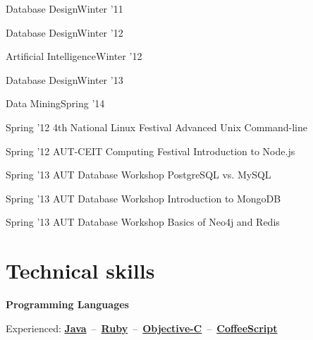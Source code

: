 \documentclass{tccv}
\begin{document}
{{\begin{ta}
\item{Database Design}{Winter '11}

\item{Database Design}{Winter '12}

\item{Artificial Intelligence}{Winter '12}

\item{Database Design}{Winter '13}

\item{Data Mining}{Spring '14}

\end{ta}



\vspace{15pt}


\begin{presenter}

\item{Spring '12}
	 {4th National Linux Festival}
	 {Advanced Unix Command-line}

\item{Spring '12}
	 {AUT-CEIT Computing Festival}
	 {Introduction to Node.js}


\item{Spring '13}
	 {AUT Database Workshop}
	 {PostgreSQL vs. MySQL}

\item{Spring '13}
	 {AUT Database Workshop}
	 {Introduction to MongoDB}

\item{Spring '13}
	 {AUT Database Workshop}
	 {Basics of Neo4j and Redis}
\end{presenter}


\vspace{-15pt}











\section{Technical skills}


\textsf{\textbf{Programming Languages}}
	 
\hspace{3pt}%
Experienced:
\mbox{\href{http://www.oracle.com/technetwork/java/}{\bf Java} -- %
     \href{https://www.ruby-lang.org/en/}{\bf Ruby} -- %
     \href{https://en.wikipedia.org/wiki/Objective-C}{\bf Objective-C} -- %
     \href{http://coffeescript.org}{\bf CoffeeScript}%
}

}}
\end{document}
